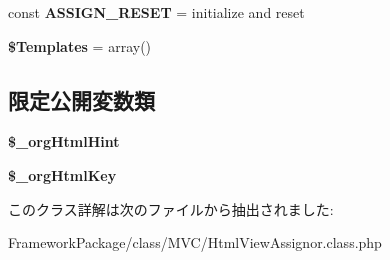\begin{DoxyCompactItemize}
\item 
\hypertarget{class_html_view_assignor_a3068046a5139fd76bc6138c6bcc101ab}{}const {\bfseries A\+S\+S\+I\+G\+N\+\_\+\+R\+E\+S\+E\+T} = \textquotesingle{}initialize and reset\textquotesingle{}\label{class_html_view_assignor_a3068046a5139fd76bc6138c6bcc101ab}

\item 
\hypertarget{class_html_view_assignor_a783b353135dd90223d376ba5d3fa6417}{}{\bfseries \$\+Templates} = array()\label{class_html_view_assignor_a783b353135dd90223d376ba5d3fa6417}

\end{DoxyCompactItemize}
\subsection*{限定公開変数類}
\begin{DoxyCompactItemize}
\item 
\hypertarget{class_html_view_assignor_a6b3fa5aa765b299e8438c5907764f041}{}{\bfseries \$\+\_\+org\+Html\+Hint}\label{class_html_view_assignor_a6b3fa5aa765b299e8438c5907764f041}

\item 
\hypertarget{class_html_view_assignor_a0e431b87ea30fb0ee3aecb703a937f93}{}{\bfseries \$\+\_\+org\+Html\+Key}\label{class_html_view_assignor_a0e431b87ea30fb0ee3aecb703a937f93}

\end{DoxyCompactItemize}


このクラス詳解は次のファイルから抽出されました\+:\begin{DoxyCompactItemize}
\item 
Framework\+Package/class/\+M\+V\+C/Html\+View\+Assignor.\+class.\+php\end{DoxyCompactItemize}

